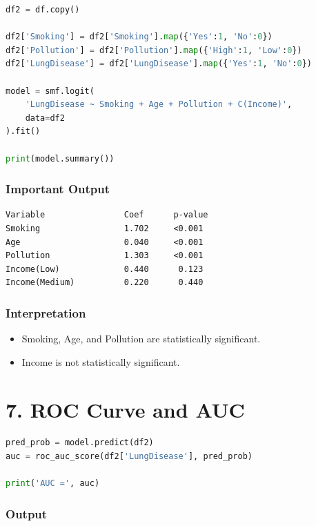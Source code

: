 \documentclass[12pt]{article}
\begin{document}
\begin{lstlisting}[language=Python]
df2 = df.copy()

df2['Smoking'] = df2['Smoking'].map({'Yes':1, 'No':0})
df2['Pollution'] = df2['Pollution'].map({'High':1, 'Low':0})
df2['LungDisease'] = df2['LungDisease'].map({'Yes':1, 'No':0})

model = smf.logit(
    'LungDisease ~ Smoking + Age + Pollution + C(Income)',
    data=df2
).fit()

print(model.summary())
\end{lstlisting}

\subsubsection*{Important Output}

\begin{verbatim}
Variable                Coef      p-value
Smoking                 1.702     <0.001
Age                     0.040     <0.001
Pollution               1.303     <0.001
Income(Low)             0.440      0.123
Income(Medium)          0.220      0.440
\end{verbatim}

\subsubsection*{Interpretation}

\begin{itemize}
\item Smoking, Age, and Pollution are statistically significant.
\item Income is not statistically significant.
\end{itemize}

\section*{7. ROC Curve and AUC}

\begin{lstlisting}[language=Python]
pred_prob = model.predict(df2)
auc = roc_auc_score(df2['LungDisease'], pred_prob)

print('AUC =', auc)
\end{lstlisting}

\subsubsection*{Output}
\end{document}
